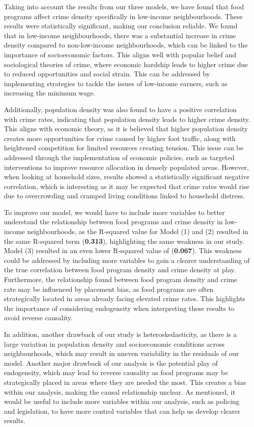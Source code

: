 \documentclass[AEJ]{AEA}
\begin{document}
Taking into account the results from our three models, we have found that food programs affect crime density specifically in low-income neighbourhoods. These results were statistically significant, making our conclusion reliable. We found that in low-income neighbourhoods, there was a substantial increase in crime density compared to non-low-income neighbourhoods, which can be linked to the importance of socioeconomic factors. This aligns well with popular belief and sociological theories of crime, where economic hardship leads to higher crime due to reduced opportunities and social strain. This can be addressed by implementing strategies to tackle the issues of low-income earners, such as increasing the minimum wage.

Additionally, population density was also found to have a positive correlation with crime rates, indicating that population density leads to higher crime density. This aligns with economic theory, as it is believed that higher population density creates more opportunities for crime caused by higher foot traffic, along with heightened competition for limited resources creating tension. This issue can be addressed through the implementation of economic policies, such as targeted interventions to improve resource allocation in densely populated areas. However, when looking at household sizes, results showed a statistically significant negative correlation, which is interesting as it may be expected that crime rates would rise due to overcrowding and cramped living conditions linked to household distress.

To improve our model, we would have to include more variables to better understand the relationship between food programs and crime density in low-income neighbourhoods, as the R-squared value for Model (1) and (2) resulted in the same R-squared term (\textbf{0.313}), highlighting the same weakness in our study. Model (3) resulted in an even lower R-squared value of (\textbf{0.067}). This weakness could be addressed by including more variables to gain a clearer understanding of the true correlation between food program density and crime density at play. Furthermore, the relationship found between food program density and crime rate may be influenced by placement bias, as food programs are often strategically located in areas already facing elevated crime rates. This highlights the importance of considering endogeneity when interpreting these results to avoid reverse causality.

In addition, another drawback of our study is heteroskedasticity, as there is a large variation in population density and socioeconomic conditions across neighbourhoods, which may result in uneven variability in the residuals of our model. Another major drawback of our analysis is the potential play of endogeneity, which may lead to reverse causality as food programs may be strategically placed in areas where they are needed the most. This creates a bias within our analysis, making the causal relationship unclear. As mentioned, it would be useful to include more variables within our analysis, such as policing and legislation, to have more control variables that can help us develop clearer results.
\end{document}
